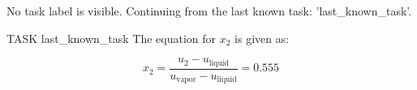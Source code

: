 No task label is visible. Continuing from the last known task: '{last_known_task}'.

TASK {last_known_task}
The equation for \( x_2 \) is given as:

\[
x_2 = \frac{u_2 - u_{\text{liquid}}}{u_{\text{vapor}} - u_{\text{liquid}}} = 0.555
\]